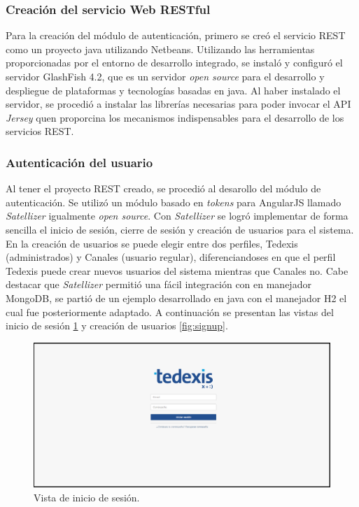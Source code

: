 \subsubsection{Creación del servicio Web RESTful}
\indent Para la creación del módulo de autenticación, primero se creó el servicio REST como un proyecto java utilizando Netbeans. Utilizando las herramientas proporcionadas por el entorno de desarrollo integrado, se instaló y configuró el servidor GlashFish 4.2, que es un servidor \textit{open source} para el desarrollo y despliegue de plataformas y tecnologías basadas en java. Al haber instalado el servidor, se procedió a instalar las librerías necesarias para poder invocar el API \textit{Jersey} quen proporcina los mecanismos indispensables para el desarrollo de los servicios REST.

\subsubsection{Autenticación del usuario}
\indent Al tener el proyecto REST creado, se procedió al desarollo del módulo de autenticación. Se utilizó un módulo basado en \textit{tokens}\cite{tokens} para AngularJS llamado \textit{Satellizer} igualmente \textit{open source}\cite{satellizer}. Con \textit{Satellizer} se logró implementar de forma sencilla el inicio de sesión, cierre de sesión y creación de usuarios para el sistema. En la creación de usuarios se puede elegir entre dos perfiles, Tedexis (administrados) y Canales (usuario regular), diferenciandoses en que el perfil Tedexis puede crear nuevos usuarios del sistema mientras que Canales no. Cabe destacar que \textit{Satellizer} permitió una fácil integración con en manejador MongoDB, se partió de un ejemplo desarrollado en java con el manejador H2 el cual fue posteriormente adaptado. A continuación se presentan las vistas del inicio de sesión \ref{fig:login} y creación de usuarios \ref{fig:signup}.
\begin{figure}[ht]
  \centering
  \includegraphics[scale=0.30,type=png,ext=.png,read=.png]{imagenes/login}
  \caption{Vista de inicio de sesión.}
  \label{fig:login}
\end{figure}

